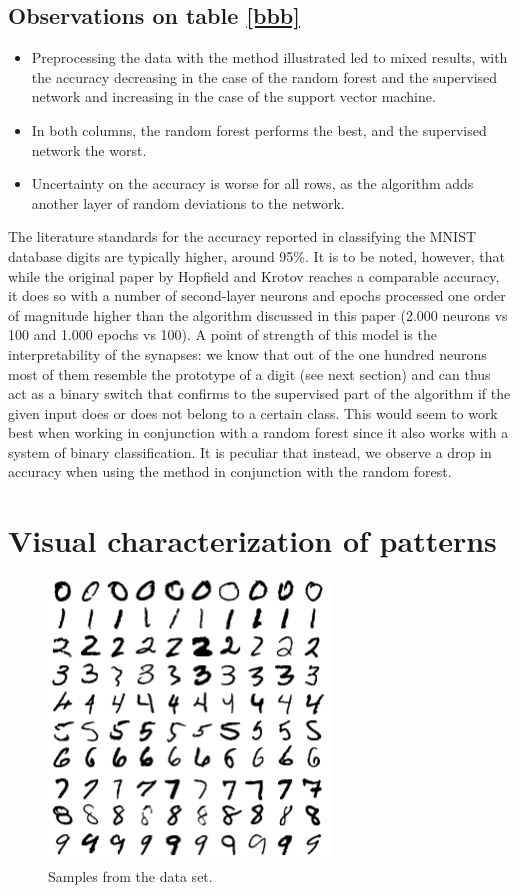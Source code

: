 \documentclass[a4paper]{report}
\begin{document}
\subsection{Observations on table \ref{bbb}}

\begin{itemize}
    \item Preprocessing the data with the method illustrated led to mixed results, with the accuracy decreasing in the case of the random forest and the supervised network and increasing in the case of the support vector machine.
    \item In both columns, the random forest performs the best, and the supervised network the worst.
    \item Uncertainty on the accuracy is worse for all rows, as the algorithm adds another layer of random deviations to the network.
\end{itemize}

The literature standards for the accuracy reported in classifying the MNIST database digits are typically higher, around 95\%.
It is to be noted, however, that while the original paper by Hopfield and Krotov reaches a comparable accuracy, it does so with a number of second-layer neurons and epochs processed one order of magnitude higher than the algorithm discussed in this paper (2.000 neurons vs 100 and 1.000 epochs vs 100).
A point of strength of this model is the interpretability of the synapses:
we know that out of the one hundred neurons most of them resemble the prototype of a digit (see next section) and can thus act as a binary switch that confirms to the supervised part of the algorithm if the given input does or does not belong to a certain class.
This would seem to work best when working in conjunction with a random forest since it also works with a system of binary classification.
It is peculiar that instead, we observe a drop in accuracy when using the method in conjunction with the random forest.

\section{Visual characterization of patterns}

\begin{figure} [H]
\centering
\includegraphics [width=7.5cm ] {o/mnist.png}
\caption{Samples from the data set.}
\label{mnist}
\end{figure}
\end{document}
